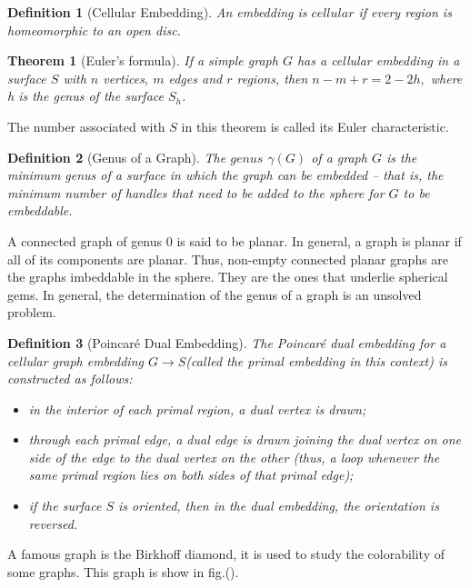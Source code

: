 \documentclass[10pt]{article}
\newtheorem{definition}{Definition}
\newtheorem{theorem}{Theorem}
\begin{document}
\begin{definition}[Cellular Embedding]
 An embedding is $cellular$ if every region is homeomorphic to an open disc.
\end{definition}

\begin{theorem}[Euler’s formula]
    If a simple graph $G$ has a cellular embedding in a surface $S$ with $n$ vertices, $m$ edges and $r$ regions, then
    $n-m+r=2-2h,$ where h is the genus of the surface $S_h$.
\end{theorem}

The number associated with $S$ in this theorem is called its Euler characteristic.

\begin{definition} [Genus of a Graph]
The $genus$ $\gamma(G)$ of a graph $G$ is the minimum genus of a surface in which the graph can be embedded – that is, the minimum number of handles that need to be added to the sphere for $G$ to be embeddable.
\end{definition}

A connected graph of genus 0 is said to be planar. In general, a graph is planar if all of its components are planar. Thus, non-empty connected planar graphs are the graphs imbeddable in the sphere. They are the ones that underlie spherical gems. In general, the determination of the genus of a graph is  an unsolved problem. 

\begin{definition}[Poincar\'e Dual Embedding]
The \emph{Poincar\'e dual embedding} for a cellular graph embedding $G\xrightarrow{}S$(called \emph{the primal embedding} in this context) is constructed as follows:
    \begin{itemize}
        \item in the interior of each primal region, a \emph{dual vertex} is drawn;
        \item through each primal edge, a \emph{dual edge} is drawn joining the dual vertex on one side of the edge to the dual vertex on the other (thus, a loop whenever the same primal region lies on both sides of that primal edge);
        \item if the surface $S$ is oriented, then in the dual embedding, the orientation is reversed.
    \end{itemize}
\end{definition}

A famous graph is the Birkhoff diamond, it is used to study the colorability of some graphs\cite{tilley2018birkhoff}. This graph is show in fig.().
\end{document}
